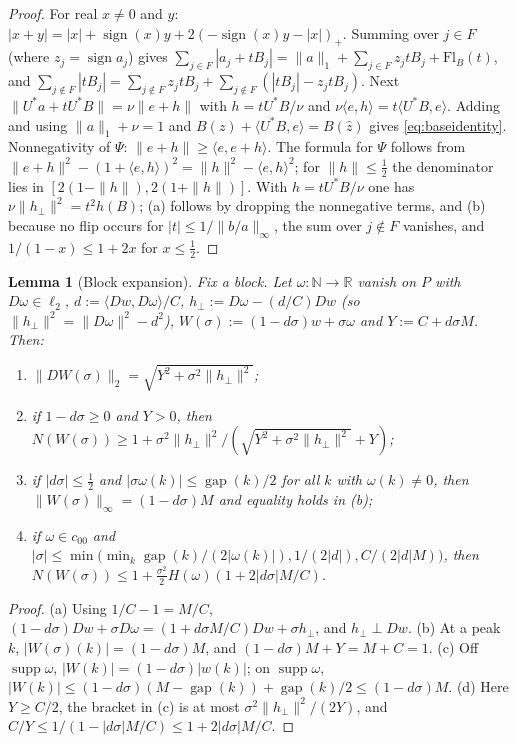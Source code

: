 \documentclass[10pt]{amsart}
\newtheorem{lemma}[theorem]{Lemma}
\theoremstyle{definition}
\theoremstyle{remark}
\newcommand{\supp}{\operatorname{supp}}
\newcommand{\sgn}{\operatorname{sign}}
\newcommand{\R}{\mathbb R}
\newcommand{\N}{\mathbb N}
\newcommand{\gap}{\operatorname{gap}}
\newcommand{\zh}{\hat z}
\newcommand{\ip}[2]{\langle #1,#2\rangle}
\begin{document}
\begin{proof}
For real $x\ne0$ and $y$: $|x+y|=|x|+\sgn(x)y+2(-\sgn(x)y-|x|)_+$.  Summing
over $j\in F$ (where $z_j=\sgn a_j$) gives
$\sum_{j\in F}|a_j+tB_j|=\|a\|_1+\sum_{j\in F}z_jtB_j+\mathrm{Fl}_B(t)$,
and $\sum_{j\notin F}|tB_j|=\sum_{j\notin F}z_jtB_j+\sum_{j\notin
F}(|tB_j|-z_jtB_j)$.  Next $\|U^*a+tU^*B\|=\nu\|e+h\|$ with $h=tU^*B/\nu$
and $\nu\ip eh=t\ip{U^*B}{e}$.  Adding and using $\|a\|_1+\nu=1$ and
$B(z)+\ip{U^*B}{e}=B(\zh)$ gives \eqref{eq:baseidentity}.  Nonnegativity of
$\Psi$: $\|e+h\|\ge\ip{e}{e+h}$.  The formula for $\Psi$ follows from
$\|e+h\|^2-(1+\ip eh)^2=\|h\|^2-\ip eh^2$; for $\|h\|\le\frac12$ the
denominator lies in $[2(1-\|h\|),2(1+\|h\|)]$.  With $h=tU^*B/\nu$ one has
$\nu\|h_\perp\|^2=t^2h(B)$; (a) follows by dropping the nonnegative terms,
and (b) because no flip occurs for $|t|\le1/\|b/a\|_\infty$, the sum over
$j\notin F$ vanishes, and $1/(1-x)\le1+2x$ for $x\le\frac12$.
\end{proof}

\begin{lemma}[Block expansion]\label{lem:block}
Fix a block.  Let $\omega:\N\to\R$ vanish on $P$ with $D\omega\in\ell_2$,
$d:=\ip{Dw}{D\omega}/C$, $h_\perp:=D\omega-(d/C)Dw$ \textup{(}so
$\|h_\perp\|^2=\|D\omega\|^2-d^2$\textup{)}, $W(\sigma):=(1-d\sigma)w+
\sigma\omega$ and $Y:=C+d\sigma M$.  Then:
\begin{enumerate}
\item[(a)] $\|DW(\sigma)\|_2=\sqrt{Y^2+\sigma^2\|h_\perp\|^2}$;
\item[(b)] if $1-d\sigma\ge0$ and $Y>0$, then
$N(W(\sigma))\ge1+\sigma^2\|h_\perp\|^2/(\sqrt{Y^2+\sigma^2\|h_\perp\|^2}+Y)$;
\item[(c)] if $|d\sigma|\le\frac12$ and $|\sigma\omega(k)|\le\gap(k)/2$ for
all $k$ with $\omega(k)\ne0$, then $\|W(\sigma)\|_\infty=(1-d\sigma)M$ and
equality holds in \textup{(b)};
\item[(d)] if $\omega\in c_{00}$ and $|\sigma|\le\min\big(\min_{k}
\gap(k)/(2|\omega(k)|),1/(2|d|),C/(2|d|M)\big)$, then
$N(W(\sigma))\le1+\frac{\sigma^2}2H(\omega)(1+2|d\sigma|M/C)$.
\end{enumerate}
\end{lemma}

\begin{proof}
(a) Using $1/C-1=M/C$, $(1-d\sigma)Dw+\sigma D\omega=(1+d\sigma M/C)Dw
+\sigma h_\perp$, and $h_\perp\perp Dw$.  (b) At a peak $k$,
$|W(\sigma)(k)|=(1-d\sigma)M$, and $(1-d\sigma)M+Y=M+C=1$.  (c) Off
$\supp\omega$, $|W(k)|=(1-d\sigma)|w(k)|$; on $\supp\omega$,
$|W(k)|\le(1-d\sigma)(M-\gap(k))+\gap(k)/2\le(1-d\sigma)M$.  (d) Here $Y\ge
C/2$, the bracket in (c) is at most $\sigma^2\|h_\perp\|^2/(2Y)$, and
$C/Y\le1/(1-|d\sigma|M/C)\le1+2|d\sigma|M/C$.
\end{proof}
\end{document}
